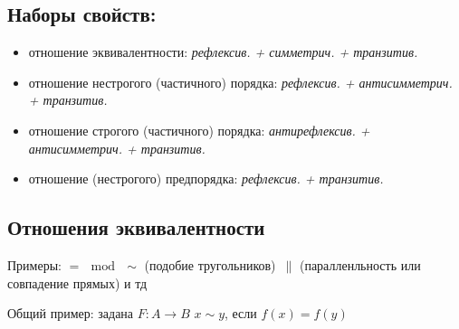 \subsection*{Наборы свойств:}
\begin{itemize}
    \item отношение эквивалентности: \textit{рефлексив. + симметрич. + транзитив.}
    \item отношение нестрогого (частичного) порядка: \textit{рефлексив. + антисимметрич. + транзитив.}
    \item отношение строгого (частичного) порядка: \textit{антирефлексив. + антисимметрич. + транзитив.}
    \item отношение (нестрогого) предпорядка: \textit{рефлексив. + транзитив.}
\end{itemize}

\subsection*{Отношения эквивалентности}
Примеры: $= \, \bmod \, \sim $ (подобие тругольников) $\, \| $ (паралленльность или совпадение прямых) и тд


Общий пример: задана $F: A \to B$ \quad $x \sim y$, если $f(x) = f(y)$


